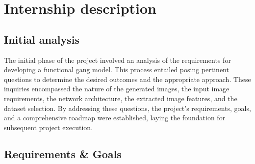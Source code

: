 \chapter{Internship description}\label{cap:internship-desc}
\section{Initial analysis}
The initial phase of the project involved an analysis of the requirements for developing a functional \gls{gang} model. 
This process entailed posing pertinent questions to determine the desired outcomes and the appropriate approach. 
These inquiries encompassed the nature of the generated images, the input image requirements, the network architecture, the extracted image features, and the dataset selection. 
By addressing these questions, the project's requirements, goals, and a comprehensive roadmap were established, laying the foundation for subsequent project execution.
\section{Requirements \& Goals}
